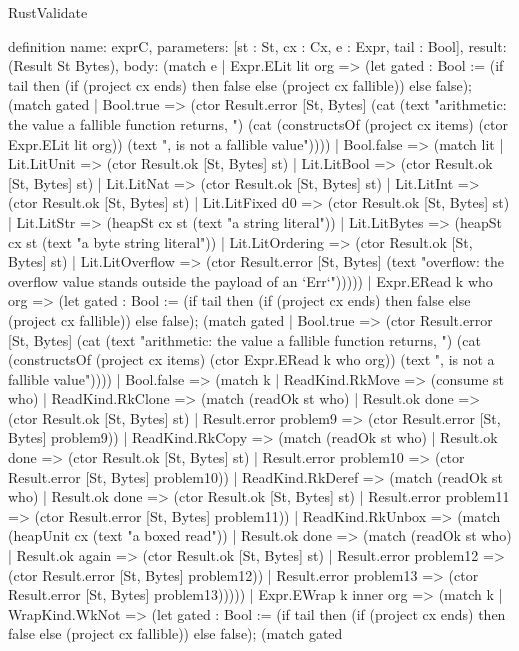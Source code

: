 \begin{lexlean}{RustValidate}
\begin{semanticmodule}
definition{
  name: exprC,
  parameters: [st : St, cx : Cx, e : Expr, tail : Bool],
  result: (Result St Bytes),
  body: (match e
    | Expr.ELit lit org => (let gated : Bool := (if tail then (if (project cx ends) then false else (project cx fallible)) else false); (match gated
      | Bool.true => (ctor Result.error [St, Bytes] (cat (text "arithmetic: the value a fallible function returns, ") (cat (constructsOf (project cx items) (ctor Expr.ELit lit org)) (text ", is not a fallible value"))))
      | Bool.false => (match lit
        | Lit.LitUnit => (ctor Result.ok [St, Bytes] st)
        | Lit.LitBool => (ctor Result.ok [St, Bytes] st)
        | Lit.LitNat => (ctor Result.ok [St, Bytes] st)
        | Lit.LitInt => (ctor Result.ok [St, Bytes] st)
        | Lit.LitFixed d0 => (ctor Result.ok [St, Bytes] st)
        | Lit.LitStr => (heapSt cx st (text "a string literal"))
        | Lit.LitBytes => (heapSt cx st (text "a byte string literal"))
        | Lit.LitOrdering => (ctor Result.ok [St, Bytes] st)
        | Lit.LitOverflow => (ctor Result.error [St, Bytes] (text "overflow: the overflow value stands outside the payload of an `Err`")))))
    | Expr.ERead k who org => (let gated : Bool := (if tail then (if (project cx ends) then false else (project cx fallible)) else false); (match gated
      | Bool.true => (ctor Result.error [St, Bytes] (cat (text "arithmetic: the value a fallible function returns, ") (cat (constructsOf (project cx items) (ctor Expr.ERead k who org)) (text ", is not a fallible value"))))
      | Bool.false => (match k
        | ReadKind.RkMove => (consume st who)
        | ReadKind.RkClone => (match (readOk st who)
          | Result.ok done => (ctor Result.ok [St, Bytes] st)
          | Result.error problem9 => (ctor Result.error [St, Bytes] problem9))
        | ReadKind.RkCopy => (match (readOk st who)
          | Result.ok done => (ctor Result.ok [St, Bytes] st)
          | Result.error problem10 => (ctor Result.error [St, Bytes] problem10))
        | ReadKind.RkDeref => (match (readOk st who)
          | Result.ok done => (ctor Result.ok [St, Bytes] st)
          | Result.error problem11 => (ctor Result.error [St, Bytes] problem11))
        | ReadKind.RkUnbox => (match (heapUnit cx (text "a boxed read"))
          | Result.ok done => (match (readOk st who)
            | Result.ok again => (ctor Result.ok [St, Bytes] st)
            | Result.error problem12 => (ctor Result.error [St, Bytes] problem12))
          | Result.error problem13 => (ctor Result.error [St, Bytes] problem13)))))
    | Expr.EWrap k inner org => (match k
      | WrapKind.WkNot => (let gated : Bool := (if tail then (if (project cx ends) then false else (project cx fallible)) else false); (match gated
}
\end{semanticmodule}
\end{lexlean}
